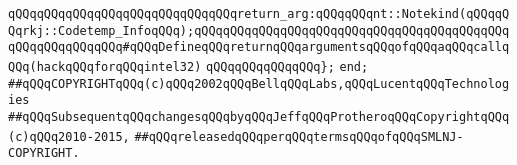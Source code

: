 \newline
\verb|qQQqqQQqqQQqqQQqqQQqqQQqqQQqqQQqreturn_arg:qQQqqQQqnt::Notekind(qQQqqQQqrkj::Codetemp_InfoqQQq);qQQqqQQqqQQqqQQqqQQqqQQqqQQqqQQqqQQqqQQqqQQqqQQqqQQqqQQqqQQq#qQQqDefineqQQqreturnqQQqargumentsqQQqofqQQqaqQQqcallqQQq(hackqQQqforqQQqintel32)|\newline
\verb|qQQqqQQqqQQqqQQq};|\newline
\verb|end;|\newline
\newline
\verb|##qQQqCOPYRIGHTqQQq(c)qQQq2002qQQqBellqQQqLabs,qQQqLucentqQQqTechnologies|\newline
\verb|##qQQqSubsequentqQQqchangesqQQqbyqQQqJeffqQQqProtheroqQQqCopyrightqQQq(c)qQQq2010-2015,|\newline
\verb|##qQQqreleasedqQQqperqQQqtermsqQQqofqQQqSMLNJ-COPYRIGHT.|\newline

